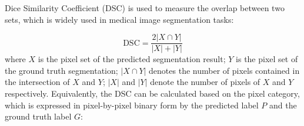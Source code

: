 %
%

Dice Similarity Coefficient (DSC) is used to measure the overlap between two sets, which is widely used in medical image segmentation tasks:

\begin{equation}
	\label{e:dsc}
	\text{DSC} = \frac{2|X \cap Y|}{|X|+|Y|}
\end{equation}
where $X$ is the pixel set of the predicted segmentation result; $Y$ is the pixel set of the ground truth segmentation; $|X \cap Y|$ denotes the number of pixels contained in the intersection of $X$ and $Y$; $|X|$ and $|Y|$ denote the number of pixels of $X$ and $Y$ respectively. Equivalently, the DSC can be calculated based on the pixel category, which is expressed in pixel-by-pixel binary form by the predicted label $P$ and the ground truth label $G$:

